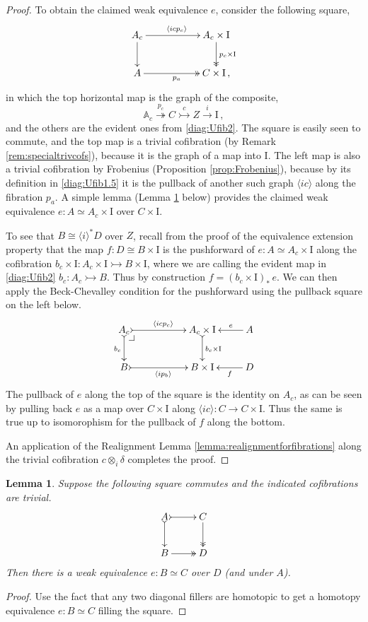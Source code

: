 \documentclass[11pt]{amsart}
\makeatletter
\newcommand{\A}{\ensuremath{\mathbb{A}}}
\newcommand{\mono}{\ensuremath{\rightarrowtail}}
\newcommand{\ra}{\ensuremath{\rightarrow}}
\newcommand{\cof}{\ensuremath{\rightarrowtail}}
\newcommand{\fib}{\ensuremath{\twoheadrightarrow}}
\renewcommand{\to}{\ensuremath{\rightarrow}}
\newcommand{\gph}[1]{\ensuremath{\langle #1 \rangle}}
\newcommand{\I}{\ensuremath{\mathrm{I}}}
\newtheorem{lemma}[theorem]{Lemma}
\theoremstyle{remark}
\theoremstyle{definition}
\newcommand{\pbcorner}[1][dr]{\save*!/#1-1.2pc/#1:(-1,1)@^{|-}\restore}
\makeatother
\begin{document}
\begin{proof}
To obtain the claimed weak equivalence $e$, consider the following square, 
\begin{equation}\label{diag:Ufibn}
\xymatrix{
A_c \ar[d] \ar[rr]^{\langle icp_c \rangle} && A_c\times\I \ar@{>>}[d]^{p_c\times \I} \\
A  \ar@{>>}[rr]_{p_a} &&  C\times\I \,,
}
\end{equation}
in which the top horizontal map is the graph of the composite,
\[
\A_c \stackrel{p_c}{\fib} C \stackrel{c}{\mono} Z \stackrel{i}{\to} \I\,,
\]
and the others are the evident ones from \eqref{diag:Ufib2}.
The square is easily seen to commute, and the top map is a trivial cofibration (by Remark \ref{rem:specialtrivcofs}), because it is the graph of a map into $\I$.  The left map is also a trivial cofibration by Frobenius (Proposition \ref{prop:Frobenius}), because by its definition in \eqref{diag:Ufib1.5} it is the pullback of another such graph $\gph{ic}$ along the fibration $p_a$.  A simple lemma (Lemma \ref{lem:simple} below) provides the claimed weak equivalence $e:A \simeq A_c\times \I$ over $C\times \I$.  

To see that $B\cong \gph{i}^*D$ over $Z$, recall from the proof of the equivalence extension property that the map $f:D\cong B\times \I$ is the pushforward of  $e:A \simeq A_c\times \I$ along the cofibration $b_c\times\I :A_c\times\I \cof B\times\I$, where we are calling the evident map in \eqref{diag:Ufib2} $b_c : A_c\cof B$.  Thus by construction $f = (b_c\times\I)_*\,e$.  We can then apply the Beck-Chevalley condition for the pushforward using the pullback square on the left below.
\begin{equation}
\xymatrix{
A_c \ar@{>->}[d]_{b_c} \ar@{>->}[rr]^{\gph{icp_c}} \pbcorner && A_c\times\I \ar@{>->}[d]^{b_c\times \I} & \ar[l]_-e A\\
B  \ar@{>->}[rr]_{\gph{ip_b}}  &&  B\times\I  & \ar[l]^-f D
}
\end{equation}
The pullback of $e$ along the top of the square is the identity on $A_c$, as can be seen by pulling back $e$ as a map over $C\times \I$ along $\gph{ic} :  C\ra C\times\I$. Thus the same is true up to isomorophism for the pullback of $f$ along the bottom.

An application of the Realignment Lemma \ref{lemma:realignmentforfibrations} along the trivial cofibration $c\otimes_i\delta$ completes the proof.
\end{proof}

\begin{lemma}\label{lem:simple}
Suppose the following square commutes and the indicated cofibrations are trivial.
\begin{equation}\label{diag:standard1}
\xymatrix{
A \ar@{>->}[d] \ar@{>->}[r] & C \ar@{>>}[d] \\
B  \ar@{>>}[r] &  D \\
}
\end{equation}
Then there is a weak equivalence $e : B \simeq C$ over $D$ (and under $A$).
\end{lemma}
\begin{proof}
Use the fact that any two diagonal fillers are homotopic to get a homotopy equivalence $e : B \simeq C$ filling the square.
\end{proof}
\end{document}
